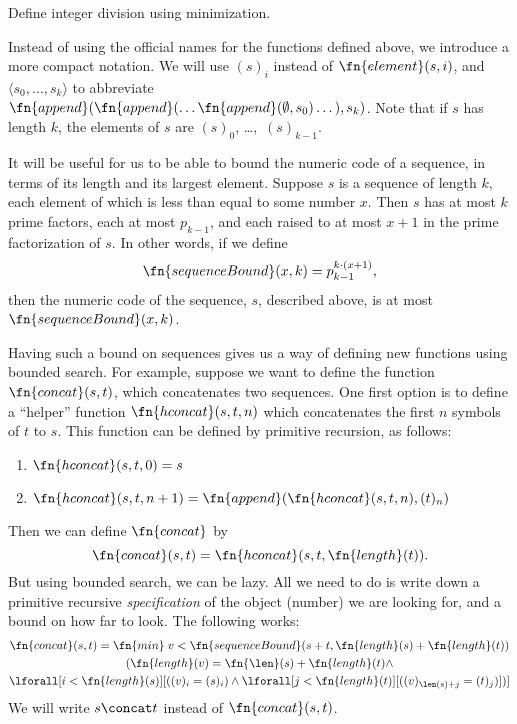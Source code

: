 \documentclass[../../include/open-logic-section]{subfiles}
\begin{document}
\begin{prob}
Define integer division using minimization.
\end{prob}

Instead of using the official names for the functions defined above,
we introduce a more compact notation.  We will use $(s)_i$ instead of
$\fn{element}(s,i)$, and $\langle s_0, \dots, s_k\rangle$ to abbreviate
$\fn{append}(\fn{append}(\dots \fn{append}(\emptyset,s_0)
\dots),s_k)$. Note that if $s$ has length $k$, the elements of $s$ are
$(s)_0$, \dots,~$(s)_{k-1}$.

It will be useful for us to be able to bound the numeric code of a
sequence, in terms of its length and its largest element. Suppose $s$
is a sequence of length $k$, each element of which is less than equal
to some number $x$. Then $s$ has at most $k$ prime factors, each at
most $p_{k-1}$, and each raised to at most $x+1$ in the prime
factorization of $s$. In other words, if we define
\[
\fn{sequenceBound}(x,k) = p_{k-1}^{k \cdot (x+1)},
\]
then the numeric code of the sequence, $s$, described above, is at
most $\fn{sequenceBound}(x,k)$.

Having such a bound on sequences gives us a way of defining new
functions using bounded search. For example, suppose we want to
define the function $\fn{concat}(s,t)$, which concatenates two
sequences. One first option is to define a ``helper'' function
$\fn{hconcat}(s,t,n)$ which concatenates the first $n$ symbols of $t$
to $s$. This function can be defined by primitive recursion, as
follows:
\begin{enumerate}
\item $\fn{hconcat}(s,t,0) = s$
\item $\fn{hconcat}(s,t,n+1) = \fn{append}(\fn{hconcat}(s,t,n),(t)_n)$
\end{enumerate}
Then we can define $\fn{concat}$ by 
\[
\fn{concat}(s,t) = \fn{hconcat}(s,t,\fn{length}(t)).
\]
But using bounded search, we can be lazy. All we need to do is write
down a primitive recursive \emph{specification} of the object (number)
we are looking for, and a bound on how far to look. The following works:
\begin{multline*}
  \fn{concat}(s,t) = \fn{min} \; {v < \fn{sequenceBound}(s+t,\fn{length}(s) +
    \fn{length}(t))} \\
  (\fn{length}(v) = \fn{\len}(s) + \fn{length}(t) \land \\
  \lforall[i < \fn{length}(s)][((v)_i = (s)_i) \land \lforall[j <
    \fn{length}(t)][((v)_{\len(s)+j} = (t)_j)])]
\end{multline*}
We will write $s \concat t$ instead of $\fn{concat}(s,t)$.
\end{document}

